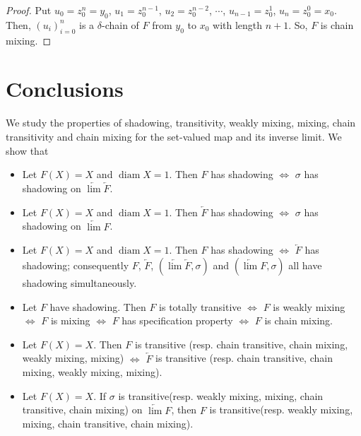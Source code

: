 \documentclass[12pt]{amsart}
\theoremstyle{definition}
\begin{document}
\begin{proof}
	Put $u_0=z^n_0=y_0$, $u_1=z^{n-1}_0$, $u_2=z^{n-2}_0$, $\cdots$, $u_{n-1}=z^{1}_0$, $u_n=z^0_0=x_0$. %
	Then, $(u_i)_{i=0}^{n}$ is a $\delta$-chain of $F$ from $y_0$ to $x_0$ with length $n+1$. So, $F$ is chain mixing.
	
	\end{proof}
	
	
	\section{Conclusions}\label{seccon}
	We study the properties of shadowing,  transitivity, weakly mixing, mixing, chain transitivity and chain mixing for the set-valued map and its inverse limit. We show that
	\begin{itemize}
\item[1] Let $F(X)=X$ and $\operatorname{diam}X=1$. Then $F$ has shadowing $\Leftrightarrow$ $\sigma$ has shadowing on $\underleftarrow{\lim} \underleftarrow{F}$.

\item[2] Let $F(X)=X$ and $\operatorname{diam}X=1$. Then $\underleftarrow{F}$ has shadowing $\Leftrightarrow$ $\sigma$ has shadowing on $\underleftarrow{\lim} F$.

\item[3] Let $F(X)=X$ and $\operatorname{diam}X=1$. Then $F$ has shadowing $\Leftrightarrow$ $\underleftarrow{F}$ has shadowing; consequently $F$, $\underleftarrow{F}$, $(\underleftarrow{\lim} \underleftarrow{F},\sigma)$ and $(\underleftarrow{\lim} F,\sigma)$ all have shadowing simultaneously. 
\item[4] Let $F$ have shadowing. Then $F$ is totally transitive $\Leftrightarrow$ $F$ is weakly mixing $\Leftrightarrow$ $F$ is mixing $\Leftrightarrow$ $F$ has specification property $\Leftrightarrow$ $F$ is chain mixing.
\item [5] Let $F(X)=X$. Then $F$ is transitive (resp. chain transitive, chain mixing, weakly mixing, mixing) $\Leftrightarrow$ $\underleftarrow{F}$ is transitive (resp. chain transitive, chain mixing, weakly mixing, mixing).

\item[6] Let $F(X)=X$. If $\sigma$ is transitive(resp. weakly mixing, mixing, chain transitive, chain mixing) on $\underleftarrow{\lim} F$, then $F$ is transitive(resp. weakly mixing, mixing, chain transitive, chain mixing).




\end{itemize}
\end{document}
